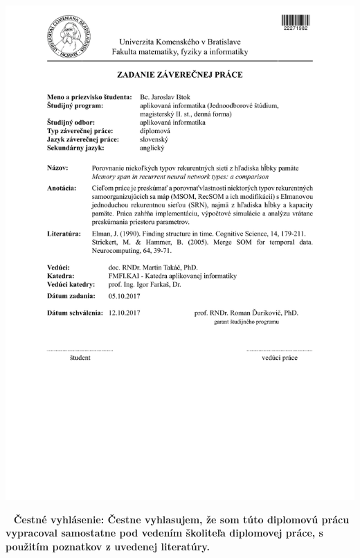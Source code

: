 \documentclass[12pt, oneside]{book}
\begin{document}
\newpage 
\thispagestyle{empty}
\hspace{-2cm}\includegraphics[width=1.1\textwidth]{assets/zadanie_master_thesis}



\frontmatter

\setcounter{page}{3}
\newpage 
~
\vfill
{\bf Čestné vyhlásenie: Čestne vyhlasujem, že som túto diplomovú prácu vypracoval samostatne pod vedením školiteľa diplomovej práce, s použitím poznatkov z uvedenej literatúry.}




 \setcounter{page}{3}
 \newpage 

 ~
\end{document}
